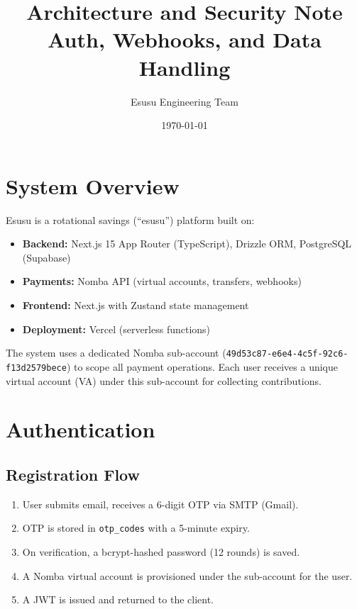 \documentclass[11pt,a4paper]{article}
\title{\textbf{Architecture and Security Note}\\[0.5em]
\large Auth, Webhooks, and Data Handling}
\author{Esusu Engineering Team}
\date{\today}
\begin{document}
\maketitle
\tableofcontents
\newpage

\section{System Overview}

Esusu is a rotational savings (``esusu'') platform built on:
\begin{itemize}[nosep]
  \item \textbf{Backend:} Next.js 15 App Router (TypeScript), Drizzle ORM, PostgreSQL (Supabase)
  \item \textbf{Payments:} Nomba API (virtual accounts, transfers, webhooks)
  \item \textbf{Frontend:} Next.js with Zustand state management
  \item \textbf{Deployment:} Vercel (serverless functions)
\end{itemize}

The system uses a dedicated Nomba sub-account
(\texttt{49d53c87-e6e4-4c5f-92c6-f13d2579bece}) to scope all payment
operations. Each user receives a unique virtual account (VA) under this
sub-account for collecting contributions.

\section{Authentication}

\subsection{Registration Flow}

\begin{enumerate}[nosep]
  \item User submits email, receives a 6-digit OTP via SMTP (Gmail).
  \item OTP is stored in \texttt{otp\_codes} with a 5-minute expiry.
  \item On verification, a bcrypt-hashed password (12 rounds) is saved.
  \item A Nomba virtual account is provisioned under the sub-account for the user.
  \item A JWT is issued and returned to the client.
\end{enumerate}
\end{document}
